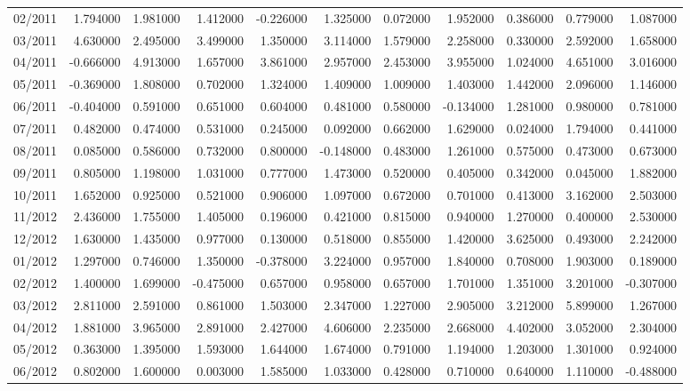 \begin{tabular}{lrrrrrrrrrr}
02/2011 & 1.794000 & 1.981000 & 1.412000 & -0.226000 & 1.325000 & 0.072000 & 1.952000 & 0.386000 & 0.779000 & 1.087000 \\
03/2011 & 4.630000 & 2.495000 & 3.499000 & 1.350000 & 3.114000 & 1.579000 & 2.258000 & 0.330000 & 2.592000 & 1.658000 \\
04/2011 & -0.666000 & 4.913000 & 1.657000 & 3.861000 & 2.957000 & 2.453000 & 3.955000 & 1.024000 & 4.651000 & 3.016000 \\
05/2011 & -0.369000 & 1.808000 & 0.702000 & 1.324000 & 1.409000 & 1.009000 & 1.403000 & 1.442000 & 2.096000 & 1.146000 \\
06/2011 & -0.404000 & 0.591000 & 0.651000 & 0.604000 & 0.481000 & 0.580000 & -0.134000 & 1.281000 & 0.980000 & 0.781000 \\
07/2011 & 0.482000 & 0.474000 & 0.531000 & 0.245000 & 0.092000 & 0.662000 & 1.629000 & 0.024000 & 1.794000 & 0.441000 \\
08/2011 & 0.085000 & 0.586000 & 0.732000 & 0.800000 & -0.148000 & 0.483000 & 1.261000 & 0.575000 & 0.473000 & 0.673000 \\
09/2011 & 0.805000 & 1.198000 & 1.031000 & 0.777000 & 1.473000 & 0.520000 & 0.405000 & 0.342000 & 0.045000 & 1.882000 \\
10/2011 & 1.652000 & 0.925000 & 0.521000 & 0.906000 & 1.097000 & 0.672000 & 0.701000 & 0.413000 & 3.162000 & 2.503000 \\
11/2012 & 2.436000 & 1.755000 & 1.405000 & 0.196000 & 0.421000 & 0.815000 & 0.940000 & 1.270000 & 0.400000 & 2.530000 \\
12/2012 & 1.630000 & 1.435000 & 0.977000 & 0.130000 & 0.518000 & 0.855000 & 1.420000 & 3.625000 & 0.493000 & 2.242000 \\
01/2012 & 1.297000 & 0.746000 & 1.350000 & -0.378000 & 3.224000 & 0.957000 & 1.840000 & 0.708000 & 1.903000 & 0.189000 \\
02/2012 & 1.400000 & 1.699000 & -0.475000 & 0.657000 & 0.958000 & 0.657000 & 1.701000 & 1.351000 & 3.201000 & -0.307000 \\
03/2012 & 2.811000 & 2.591000 & 0.861000 & 1.503000 & 2.347000 & 1.227000 & 2.905000 & 3.212000 & 5.899000 & 1.267000 \\
04/2012 & 1.881000 & 3.965000 & 2.891000 & 2.427000 & 4.606000 & 2.235000 & 2.668000 & 4.402000 & 3.052000 & 2.304000 \\
05/2012 & 0.363000 & 1.395000 & 1.593000 & 1.644000 & 1.674000 & 0.791000 & 1.194000 & 1.203000 & 1.301000 & 0.924000 \\
06/2012 & 0.802000 & 1.600000 & 0.003000 & 1.585000 & 1.033000 & 0.428000 & 0.710000 & 0.640000 & 1.110000 & -0.488000 \\

\end{tabular}
